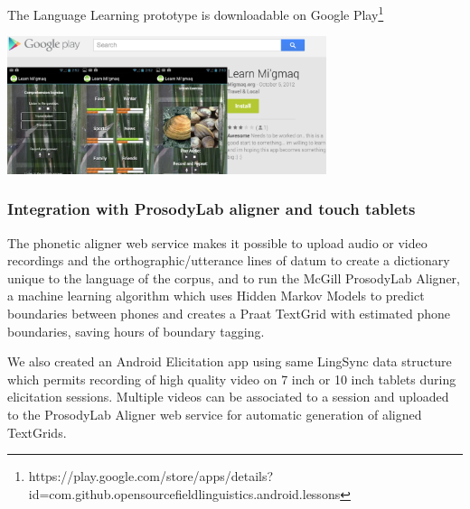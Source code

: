 \documentclass[letterpaper, 12pt, dvips]{mitwpl}
\begin{document}
\begin{exe} 
\ex The Language Learning prototype is downloadable on Google Play\footnote{https://play.google.com/store/apps/details?id=com.github.opensourcefieldlinguistics.android.lessons}

 \centering
   \includegraphics[width=0.7\textwidth]{languageLearningApp} 

\label{ex:languageLearningApp}
\end{exe}

\subsubsection{Integration with ProsodyLab aligner and touch tablets}
\label{sec:phoneticwebservice}

The phonetic aligner web service makes it possible to upload audio or video recordings and the orthographic/utterance lines of datum to create a dictionary unique to the language of the corpus,
and to run the McGill ProsodyLab Aligner,
a machine learning algorithm which uses Hidden Markov Models to predict boundaries between phones and creates a Praat TextGrid with estimated phone boundaries,
saving hours of boundary tagging.


We also created an Android Elicitation app using same LingSync data structure which permits recording of high quality video on 7 inch or 10 inch tablets during elicitation sessions.
Multiple videos can be associated to a session and uploaded to the ProsodyLab Aligner web service for automatic generation of aligned TextGrids. 

%
\end{document}
